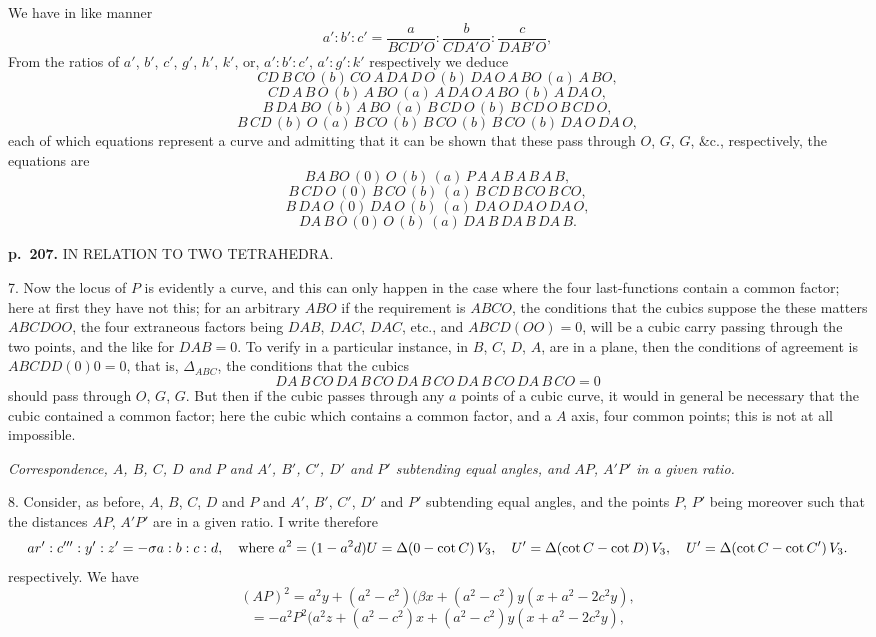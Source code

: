 \documentclass[11pt,a4paper]{article}
\begin{document}
We have in like manner
\[
a' : b' : c' = \frac{a}{BCD'O} : \frac{b}{CDA'O} : \frac{c}{DAB'O},
\]
From the ratios of $a'$, $b'$, $c'$, $g'$, $h'$, $k'$, or, $a' : b' : c'$, $a' : g' : k'$ respectively we deduce
\[
CD\,B\,CO\,(b)\,CO\,A\,DA\,D\,O\,(b)\,DA\,O\,A\,BO\,(a)\,A\,BO,
\]
\[
CD\,A\,B\,O\,(b)\,A\,BO\,(a)\,A\,DA\,O\,A\,BO\,(b)\,A\,DA\,O,
\]
\[
B\,DA\,BO\,(b)\,A\,BO\,(a)\,B\,CD\,O\,(b)\,B\,CD\,O\,B\,CD\,O,
\]
\[
B\,CD\,(b)\,O\,(a)\,B\,CO\,(b)\,B\,CO\,(b)\,B\,CO\,(b)\,DA\,O\,DA\,O,
\]
each of which equations represent a curve and admitting that it can be shown that these pass through $O$, $G$, $G$, \&c., respectively, the equations are
\[
BA\,BO\,(0)\,O\,(b)\,(a)\,P\,A\,A\,B\,A\,B\,A\,B,
\]
\[
B\,CD\,O\,(0)\,B\,CO\,(b)\,(a)\,B\,CD\,B\,CO\,B\,CO,
\]
\[
B\,DA\,O\,(0)\,DA\,O\,(b)\,(a)\,DA\,O\,DA\,O\,DA\,O,
\]
\[
DA\,B\,O\,(0)\,O\,(b)\,(a)\,DA\,B\,DA\,B\,DA\,B.
\]

\clearpage

\noindent
\textbf{p.~207.}  IN RELATION TO TWO TETRAHEDRA.

7. Now the locus of $P$ is evidently a curve, and this can only happen in the case where the four last-functions contain a common factor; here at first they have not this; for an arbitrary $ABO$ if the requirement is $ABCO$, the conditions that the cubics suppose the these matters $ABCDOO$, the four extraneous factors being $DA B$, $DA C$, $DA C$, etc., and $ABCD(OO) = 0$, will be a cubic carry passing through the two points, and the like for $DA B = 0$. To verify in a particular instance, in $B$, $C$, $D$, $A$, are in a plane, then the conditions of agreement is $ABCDD(0)0 = 0$, that is, $\Delta_{ABC}$, the conditions that the cubics
\[
DA\,B\,CO\,DA\,B\,CO\,DA\,B\,CO\,DA\,B\,CO\,DA\,B\,CO = 0
\]
should pass through $O$, $G$, $G$. But then if the cubic passes through any $a$ points of a cubic curve, it would in general be necessary that the cubic contained a common factor; here the cubic which contains a common factor, and a $A$ axis, four common points; this is not at all impossible.

\textit{Correspondence, $A$, $B$, $C$, $D$ and $P$ and $A'$, $B'$, $C'$, $D'$ and $P'$ subtending equal angles, and $AP$, $A'P'$ in a given ratio.}

8. Consider, as before, $A$, $B$, $C$, $D$ and $P$ and $A'$, $B'$, $C'$, $D'$ and $P'$ subtending equal angles, and the points $P$, $P'$ being moreover such that the distances $AP$, $A'P'$ are in a given ratio. I write therefore
\[
ar' : c''' : y' : z' = -\sigma a : b : c : d, \quad \text{where } a^2 = (1 - a^2 d) \\
U = \Delta(0 - \cot C)\,V_3, \quad U' = \Delta(\cot C - \cot D)\,V_3, \quad U' = \Delta(\cot C - \cot C')\,V_3.
\]
respectively. We have
\[
(AP)^2 = a^2 y + (a^2 - c^2)(\beta x + (a^2 - c^2)y(x + a^2 - 2c^2 y),
\]
\[
= -a^2 P^2 (a^2 z + (a^2 - c^2)x + (a^2 - c^2)y(x + a^2 - 2c^2 y),
\]
\end{document}
